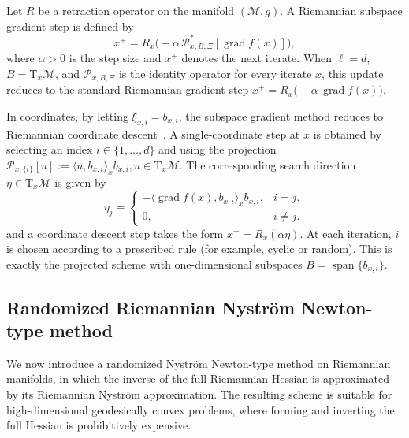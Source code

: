 \documentclass[final,onefignum,onetabnum]{siamart250211}
\DeclareMathOperator{\grad}{grad}
\begin{document}
Let $R$ be a retraction operator on the manifold $(\mathcal{M}, g)$.
A Riemannian subspace gradient step is defined by
\[
x^{+}=R_{x}\bigl(-\alpha\, \mathcal{P}_{x,B,\Xi}^{*}[\grad f(x)]\bigr),
\]
where $\alpha>0$ is the step size and $x^{+}$ denotes the next iterate.
When $\ell=d$, $B=\mathrm{T}_{x}\mathcal{M}$, and $\mathcal{P}_{x,B,\Xi}$ is the identity operator for every iterate $x$, this update reduces to the standard Riemannian gradient step
$
x^{+}=R_{x}\bigl(-\alpha\,\grad f(x)\bigr)
$.

  In coordinates, by letting $\xi_{x, i} = b_{x, i}$, the subspace gradient method reduces to Riemannian coordinate descent~\cite{han2024riemannian}.
A single-coordinate step at $x$ is obtained by selecting an index $i \in \{1,\dots,d\}$ and using the projection
$
\mathcal{P}_{x,\{i\}}[u] := \langle u,b_{x,i}\rangle_x b_{x,i}, u \in \mathrm{T}_x \mathcal{M}.
$
The corresponding search direction $\eta \in \mathrm{T}_x\mathcal{M}$ is given by
\[
\eta_j 
=
\begin{cases}
-\langle \operatorname{grad} f(x),b_{x,i}\rangle_x b_{x,i}, & i = j, \\
0, & i \neq j.
\end{cases}
\]
and a coordinate descent step takes the form
$
x^+ = R_{x}(\alpha \eta).
$
At each iteration, $i$ is chosen according to a prescribed rule (for example, cyclic or random). This is exactly the projected scheme with one-dimensional subspaces $B = \operatorname{span}\{b_{x,i}\}$. 

\subsection{Randomized Riemannian Nystr\"om Newton-type method}
\label{sec:ssn-abstract}
We now introduce a randomized Nystr\"om Newton-type method on Riemannian manifolds, in which the inverse of the full Riemannian Hessian is approximated by its Riemannian Nystr\"om approximation. The resulting scheme is suitable for high-dimensional geodesically convex problems, where forming and inverting the full Hessian is prohibitively expensive.
\end{document}
